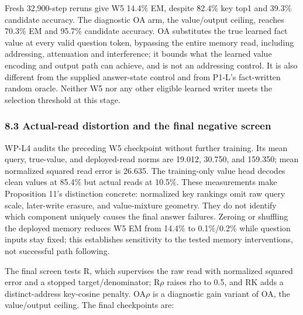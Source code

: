 Fresh 32,900-step reruns give W5 14.4\% EM, despite 82.4\% key top1 and 39.3\%
candidate accuracy. The diagnostic OA arm, the value/\allowbreak{}output ceiling, reaches  %
70.3\% EM and 95.7\% candidate accuracy. OA substitutes the true learned fact  %
value at every valid question token, bypassing the entire memory read, including
addressing, attenuation and interference; it bounds what the learned value encoding and
output path can achieve, and is not an addressing control.  %
It is also different from the supplied answer-state control and from P1-L’s
fact-written random oracle. Neither W5 nor any  %
other eligible learned writer meets the selection threshold at this stage.

\subsubsection*{8.3 Actual-read distortion and the final negative screen}

WP-L4 audits the preceding W5 checkpoint without further training. Its mean query,
true-value, and deployed-read norms are 19.012, 30.750, and 159.350; mean normalized
squared read error is 26.635. The training-only value head decodes  %
clean values at 85.4\% but actual reads at 10.5\%. These measurements  %
make Proposition 11’s distinction concrete: normalized key rankings omit raw
query scale, later-write erasure, and value-mixture geometry. They do not identify
which component uniquely causes the final answer failures. Zeroing  %
or shuffling the deployed memory reduces W5 EM from 14.4\% to 0.1\%/\allowbreak{}0.2\% while
question inputs stay fixed; this establishes sensitivity to the tested memory
interventions, not successful path following.  %

The final screen tests R, which supervises the raw read with normalized squared
error and a stopped target/\allowbreak{}denominator; R\ensuremath{\rho} raises rho to 0.5, and RK adds a
distinct-address key-cosine penalty. OA\ensuremath{\rho} is a diagnostic gain variant  %
of OA, the value/\allowbreak{}output ceiling. The final checkpoints are:  %



